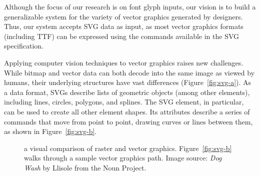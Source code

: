 Although the focus of our research is on font glyph inputs, our vision is to build a generalizable system for the variety of vector graphics generated by designers.
Thus, our system accepts SVG data as input, as most vector graphics formats (including TTF) can be expressed using the commands available in the SVG specification.

Applying computer vision techniques to vector graphics raises new challenges.
While bitmap and vector data can both decode into the same image as viewed by humans, their underlying structures have vast differences (Figure~\ref{fig:svg-a}).
As a data format, SVGs describe lists of geometric objects (among other elements), including lines, circles, polygons, and splines.
The SVG  element, in particular, can be used to create all other element shapes.
Its attributes describe a series of commands that move from point to point, drawing curves or lines between them, as shown in Figure~\ref{fig:svg-b}.

\begin{figure}[t]
     \quad
    \caption[An overview of the specification for scalable vector graphics (SVG)]{a visual comparison of raster and vector graphics. Figure~\ref{fig:svg-b} walks through a sample vector graphics path. Image source: \textit{Dog Wash} by Llisole from the Noun Project.\label{fig:svg}}
\end{figure}


